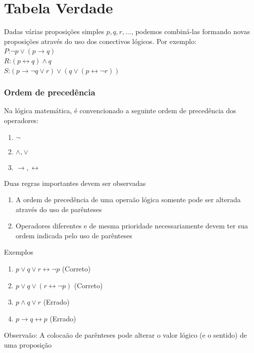 \section{Tabela Verdade}

\hspace{0,5cm}Dadas várias proposições simples $p,q,r,...$, podemos combiná-las formando novas proposições através do uso dos conectivos lógicos. Por exemplo:\\
\textbf{$P$}:$\neg p\vee(p\rightarrow q)$\\
\textbf{$R$}:$(p\leftrightarrow q)\wedge q$\\
\textbf{$S$}:$(p\rightarrow\neg q\vee r)\vee(q\vee(p\leftrightarrow\neg r))$

\subsubsection{Ordem de precedência}

Na lógica matemática, é convencionado a seguinte ordem de precedência dos operadores:
\begin{enumerate}
\item $\neg$
\item $\wedge,\vee$
\item $\rightarrow,\leftrightarrow$
\end{enumerate}

Duas regras importantes devem ser observadas
\begin{enumerate}
\item A ordem de precedência de uma operaão lógica somente pode ser alterada através do uso de parênteses
\item Operadores diferentes e de mesma prioridade necessariamente devem ter sua ordem indicada pelo uso de parênteses
\end{enumerate}

Exemplos
\begin{enumerate}
\item $p\vee q\vee r\leftrightarrow\neg p$ (Correto)
\item $p\vee q\vee(r\leftrightarrow\neg p)$ (Correto)
\item $p\wedge q\vee r$ (Errado)
\item $p\rightarrow q\leftrightarrow p$ (Errado)
\end{enumerate}

Observaão: A colocaão de parênteses pode alterar o valor lógico (e o sentido) de uma proposição

